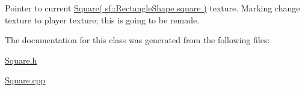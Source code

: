 Pointer to current \hyperlink{class_square}{Square( sf\+::\+Rectangle\+Shape square )} texture. Marking change texture to player texture; this is going to be remade. 



The documentation for this class was generated from the following files\+:\begin{DoxyCompactItemize}
\item 
\hyperlink{_square_8h}{Square.\+h}\item 
\hyperlink{_square_8cpp}{Square.\+cpp}\end{DoxyCompactItemize}
